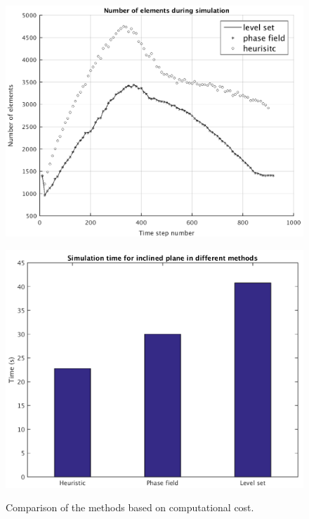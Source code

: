 \documentclass[review]{elsarticle}
\begin{document}
  
\begin{figure}[H]
        \begin{minipage}[b]{.5\textwidth}
                \centering
                \includegraphics[width=1\textwidth]{IMAGES/incline_num_elem.png}
                \label{mesh_inc}
                
        \end{minipage}
        \begin{minipage}[b]{.5\textwidth}
                \centering
                \includegraphics[width=1\textwidth]{IMAGES/incline_timing1.png}
                \label{barplot_inc}
                
        \end{minipage}
        \caption{Comparison of the methods based on computational cost.}
        \label{compinc_comput}
\end{figure}
\end{document}

